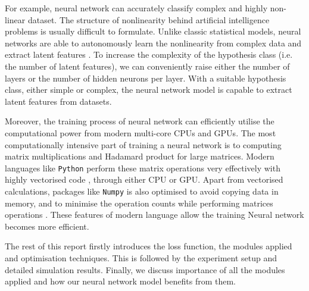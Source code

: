 For example, neural network can accurately classify complex and highly non-linear dataset. The structure of nonlinearity behind artificial intelligence problems is usually difficult to formulate. Unlike classic statistical models, neural networks are able to autonomously learn the nonlinearity from complex data and extract latent features \citep{Bishop:2006:PRM:1162264}. To increase the complexity of the hypothesis class (i.e. the number of latent features), we can conveniently raise either the number of layers or the number of hidden neurons per layer.  
With a suitable hypothesis class, either simple or complex, the neural network model is capable to extract latent features from datasets.

Moreover, the training process of neural network can efficiently utilise the computational power from modern multi-core CPUs and GPUs. The most computationally intensive part of training a neural network is to computing matrix multiplications and Hadamard product for large matrices. Modern languages like \texttt{Python} perform these matrix operations very effectively with highly vectorised code \citep{5725236}, through either CPU or GPU. Apart from vectorised calculations, packages like \texttt{Numpy} is also optimised to avoid copying data in memory, and to minimise the operation counts while performing matrices operations \citep{5725236}. These features of modern language allow the training Neural network becomes more efficient.

The rest of this report firstly introduces the loss function, the modules applied and optimisation techniques. 
This is followed by the experiment setup and detailed simulation results.
Finally, we discuss importance of all the modules applied and how our neural network model benefits from them.
